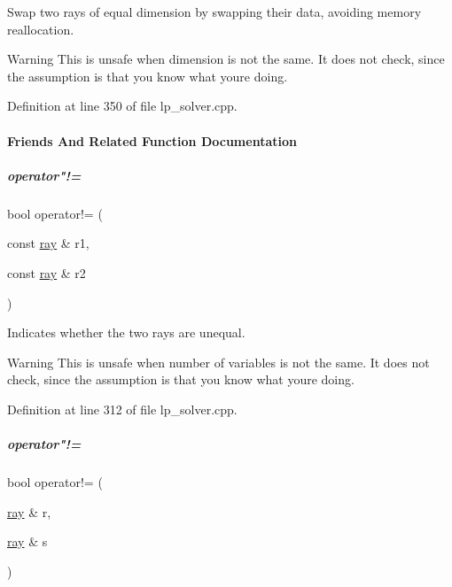 Swap two rays of equal dimension by swapping their data, avoiding memory reallocation. 

\begin{DoxyWarning}{Warning}
This is unsafe when dimension is not the same. It does not check, since the assumption is that you know what you\textquotesingle{}re doing. 
\end{DoxyWarning}


Definition at line 350 of file lp\+\_\+solver.\+cpp.



\paragraph{Friends And Related Function Documentation}
\mbox{\label{group___c_l_s_solvers_a22b7d226858aa935e739c696065e4680}} 
\subparagraph{\texorpdfstring{operator"!=}{operator!=}\hspace{0.1cm}{\footnotesize\ttfamily [1/2]}}
{\footnotesize\ttfamily bool operator!= (\begin{DoxyParamCaption}\item[{const \hyperlink{group___c_l_s_solvers_classray}{ray} \&}]{r1,  }\item[{const \hyperlink{group___c_l_s_solvers_classray}{ray} \&}]{r2 }\end{DoxyParamCaption})\hspace{0.3cm}{\ttfamily [friend]}}



Indicates whether the two rays are unequal. 

\begin{DoxyWarning}{Warning}
This is unsafe when number of variables is not the same. It does not check, since the assumption is that you know what you\textquotesingle{}re doing. 
\end{DoxyWarning}


Definition at line 312 of file lp\+\_\+solver.\+cpp.

\mbox{\label{group___c_l_s_solvers_a088bbdf2a6fc03509fc660aa3aee110e}} 
\subparagraph{\texorpdfstring{operator"!=}{operator!=}\hspace{0.1cm}{\footnotesize\ttfamily [2/2]}}
{\footnotesize\ttfamily bool operator!= (\begin{DoxyParamCaption}\item[{\hyperlink{group___c_l_s_solvers_classray}{ray} \&}]{r,  }\item[{\hyperlink{group___c_l_s_solvers_classray}{ray} \&}]{s }\end{DoxyParamCaption})\hspace{0.3cm}{\ttfamily [friend]}}



